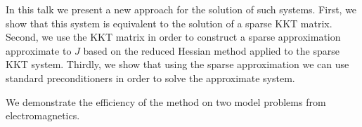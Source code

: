\documentclass{article}
\begin{document}
In this talk we present a new approach for the solution of such systems.
First, we show that this system is equivalent to the solution
of a sparse KKT matrix. Second, we use the KKT matrix in order to
construct a sparse approximation approximate to $J$
based on  the reduced Hessian method applied to the sparse KKT system.
Thirdly, we show that using the sparse approximation
we can use standard preconditioners in order to solve
the approximate system.


 
We demonstrate the efficiency of the method on two model problems
from electromagnetics.
\end{document}
